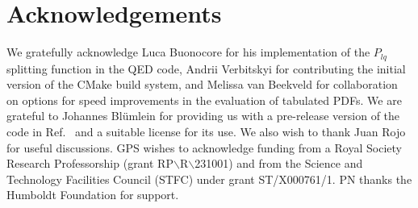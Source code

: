 \documentclass[preprint,1p,a4paper,11pt]{elsarticle}
\begin{document}
\section*{Acknowledgements}


We gratefully acknowledge Luca Buonocore for his
implementation of the $P_{lq}$ splitting function in the QED code,
Andrii Verbitskyi for contributing the initial version of the CMake
build system,
%
and Melissa van Beekveld for collaboration on options for speed
improvements in the evaluation of tabulated PDFs.
%
We are grateful to Johannes Bl\"umlein for providing us with a
pre-release version of the code in Ref.~\cite{BlumleinCode} and a
suitable license for its use.
%
We also wish to thank Juan Rojo for useful discussions. 
%
GPS wishes to acknowledge funding from a Royal Society Research
Professorship (grant RP$\backslash$R$\backslash$231001) and from the Science and
Technology Facilities Council (STFC) under grant ST/X000761/1.
%
PN thanks the Humboldt Foundation for support. 
%
\appendix





%
\end{document}
